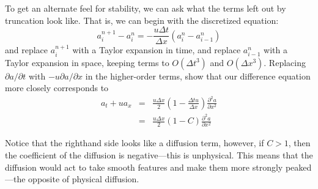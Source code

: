 \begin{exercise}
{To get an alternate feel for stability, we can ask
  what the terms left out by truncation look like.  That is, we can
  begin with the discretized equation:
\begin{equation}
  a_i^{n+1} - a_i^n = -\frac{u \Delta t}{\Delta x} ( a_i^n - a_{i-1}^n )
\end{equation}
and replace $a_i^{n+1}$ with a Taylor expansion in time, and replace
$a_{i-1}^n$ with a Taylor expansion in space, keeping terms to
$O(\Delta t^3)$ and $O(\Delta x^3)$.  Replacing $\partial a/\partial t$
with $-u \partial a/ \partial x$ in the higher-order terms, show 
that our difference equation more closely corresponds to 
\begin{eqnarray}
a_t + u a_x &=& \frac{u \Delta x}{2} \left ( 1 - \frac{\Delta t u}{\Delta x} \right ) \frac{\partial^2 a}{\partial x^2} \\
            &=& \frac{u \Delta x}{2} (1 - C) \frac{\partial^2 a}{\partial x^2}
\end{eqnarray}

\noindent Notice that the righthand side looks like a diffusion term, however,
if $C > 1$, then the coefficient of the diffusion is negative---this is
unphysical.  This means that the diffusion would act to take smooth
features and make them more strongly peaked---the opposite of physical
diffusion.

}
\end{exercise}

